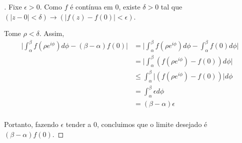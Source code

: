 \def\e{e}

\begin{proof}[]
Fixe $\epsilon>0$.
Como $f$ é contínua em $0$, existe $\delta>0$ tal que $(\lvert z-0 \rvert < \delta)\rightarrow(\lvert f(z)-f(0)\rvert<\epsilon)$.

Tome $\rho<\delta$.
Assim,
\begin{align*}
\lvert \int_{\alpha}^{\beta}f(\rho\e^{i\phi})d\phi -(\beta-\alpha)f(0)\rvert &= \lvert \int_{\alpha}^{\beta}f(\rho\e^{i\phi})d\phi -\int_{\alpha}^{\beta}f(0)d\phi \rvert  \\
&=\lvert \int_{\alpha}^{\beta}(f(\rho\e^{i\phi})-f(0))d\phi\rvert \\
&\leq \int_{\alpha}^{\beta}\lvert (f(\rho\e^{i\phi})-f(0))\rvert d\phi \\
&=\int_{\alpha}^{\beta}\epsilon d\phi \\
&=(\beta -\alpha)\epsilon \\
\end{align*}

Portanto, fazendo $\epsilon$ tender a $0$, concluimos que o limite desejado é $(\beta - \alpha)f(0)$.




\end{proof}



